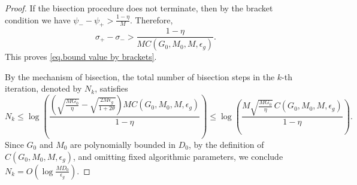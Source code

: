 \documentclass[10pt,a4paper]{amsart}
\begin{document}
\begin{proof}
    If the bisection procedure does not terminate, then by the bracket condition
    we have
    \(
    \psi_- - \psi_+
    >
    \frac{1-\eta}{M}.
    \)
    Therefore,
    \[
        \sigma_+-\sigma_-
        >
        \frac{1-\eta}
        {M C(G_0,M_0,M,\epsilon_g)}.
    \]
    This proves \eqref{eq.bound value by brackets}.

    By the mechanism of bisection, the total number of bisection steps in the
    \(k\)-th iteration, denoted by \(N_k\), satisfies
    \[
        N_k
        \le
        \log\left(
        \frac{
                \left(
                \sqrt{\frac{MG_0}{\eta}}
                -
                \sqrt{\frac{2M\epsilon_g}{1+2\theta}}
                \right)
                M C(G_0,M_0,M,\epsilon_g)
            }{
                1-\eta
            }
        \right)
        \le
        \log\left(
        \frac{
                M\sqrt{\frac{MG_0}{\eta}}\,
                C(G_0,M_0,M,\epsilon_g)
            }{
                1-\eta
            }
        \right).
    \]
    Since \(G_0\) and \(M_0\) are polynomially bounded in \(D_0\), by the
    definition of \(C(G_0,M_0,M,\epsilon_g)\), and omitting fixed algorithmic
    parameters, we conclude
    \(
    N_k
    =
    O\left(
    \log\frac{MD_0}{\epsilon_g}
    \right).
    \)
\end{proof}
\end{document}

